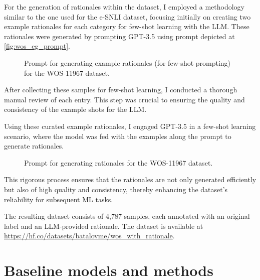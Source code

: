 For the generation of rationales within the dataset, I employed a methodology similar to the one used for the e-SNLI dataset, focusing initially on creating two example rationales for each category for few-shot learning with the LLM\@. These rationales were generated by prompting GPT-3.5 using prompt depicted at \autoref{fig:wos_eg_prompt}.

\begin{figure}[ht!]
    \centering
    
    \caption{Prompt for generating example rationales (for few-shot prompting) for the WOS-11967 dataset.}
    \label{fig:wos_eg_prompt}
\end{figure}

After collecting these samples for few-shot learning, I conducted a thorough manual review of each entry. This step was crucial to ensuring the quality and consistency of the example shots for the LLM\@.

Using these curated example rationales, I engaged GPT-3.5 in a few-shot learning scenario, where the model was fed with the examples along the prompt to generate rationales.

\begin{figure}[ht!]
    \centering
    
    \caption{Prompt for generating rationales for the WOS-11967 dataset.}
    \label{fig:wos_prompt}
\end{figure}

This rigorous process ensures that the rationales are not only generated efficiently but also of high quality and consistency, thereby enhancing the dataset's reliability for subsequent ML tasks.

The resulting dataset consists of 4,787 samples, each annotated with an original label and an LLM-provided rationale. The dataset is available at \linebreak \url{https://hf.co/datasets/batalovme/wos_with_rationale}.

\section{Baseline models and methods}
\label{sec:baselines}

